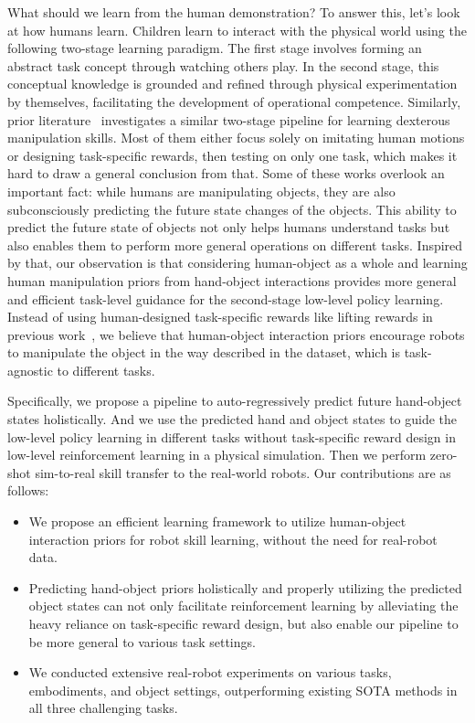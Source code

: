 \documentclass[letterpaper]{article}
\begin{document}
What should we learn from the human demonstration? To answer this, let's look at how humans learn. Children learn to interact with the physical world using the following two-stage learning paradigm. The first stage involves forming an abstract task concept through watching others play. In the second stage, this conceptual knowledge is grounded and refined through physical experimentation by themselves, facilitating the development of operational competence. Similarly, prior literature~\cite{qin2022dexmv,chen2024vividex,shi2025learning, chen2024object, li2025maniptrans} investigates a similar two-stage pipeline for learning dexterous manipulation skills. Most of them either focus solely on imitating human motions or designing task-specific rewards, then testing on only one task, which makes it hard to draw a general conclusion from that. Some of these works overlook an important fact: while humans are manipulating objects, they are also subconsciously predicting the future state changes of the objects. This ability to predict the future state of objects not only helps humans understand tasks but also enables them to perform more general operations on different tasks. Inspired by that, our observation is that considering human-object as a whole and learning human manipulation priors from hand-object interactions provides more general and efficient task-level guidance for the second-stage low-level policy learning. Instead of using human-designed task-specific rewards like lifting rewards in previous work~\cite{chen2024vividex, shi2025learning}, we believe that human-object interaction priors encourage robots to manipulate the object in the way described in the dataset, which is task-agnostic to different tasks.

Specifically, we propose a pipeline to auto-regressively predict future hand-object states holistically. And we use the predicted hand and object states to guide the low-level policy learning in different tasks without task-specific reward design in low-level reinforcement learning in a physical simulation. Then we perform zero-shot sim-to-real skill transfer to the real-world robots. Our contributions are as follows:

\begin{itemize}
    \item We propose an efficient learning framework to utilize human-object interaction priors for robot skill learning, without the need for real-robot data.
    \item Predicting hand-object priors holistically and properly utilizing the predicted object states can not only facilitate reinforcement learning by alleviating the heavy reliance on task-specific reward design, but also enable our pipeline to be more general to various task settings.
    \item We conducted extensive real-robot experiments on various tasks, embodiments, and object settings, outperforming existing SOTA methods in all three challenging tasks.

\end{itemize}
\end{document}
